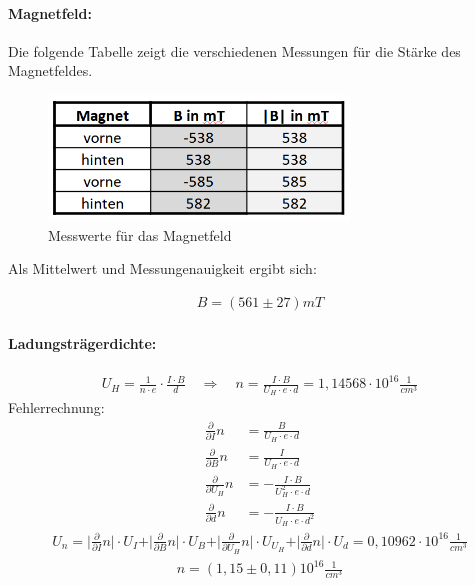 \documentclass[a4paper]{scrartcl}
\numberwithin{equation}{subsection}
\begin{document}
\paragraph{Magnetfeld:\\}
Die folgende Tabelle zeigt die verschiedenen Messungen für die Stärke des Magnetfeldes.

\begin{figure}[H]
\includegraphics[width=8cm]{tabelle_messwerte_megnetfeld}
\centering
\caption{Messwerte für das Magnetfeld}
\centering
\label{fig:tabelle_messwerte_megnetfeld}
\end{figure}

Als Mittelwert und Messungenauigkeit ergibt sich:

\begin{align*}
B = (561\pm27)mT
\end{align*}

\paragraph{Ladungsträgerdichte:\\}
\begin{align}
U_H = \frac{1}{n \cdot e} \cdot \frac{I \cdot B}{d} \quad \Rightarrow \quad n = \frac{I \cdot B}{U_H \cdot e \cdot d} = 1,14568 \cdot 10^{16} \frac{1}{cm^3}
\end{align}
Fehlerrechnung:
\begin{align*}
\frac{\partial}{\partial I} n &= \frac{B}{U_H \cdot e \cdot d} \\
\frac{\partial}{\partial B} n &= \frac{I}{U_H \cdot e \cdot d} \\
\frac{\partial}{\partial U_H} n &= -\frac{I \cdot B}{U_H^2 \cdot e \cdot d} \\
\frac{\partial}{\partial d} n &= -\frac{I \cdot B}{U_H \cdot e \cdot d^2}
\end{align*}
\begin{align*}
U_{n} = \vert \frac{\partial}{\partial I} n \vert \cdot U_{I} + 
		\vert \frac{\partial}{\partial B} n \vert \cdot U_{B} +
		\vert \frac{\partial}{\partial U_H} n \vert \cdot U_{U_H} +
		\vert \frac{\partial}{\partial d} n \vert \cdot U_{d} = 0,10962 \cdot 10^{16} \frac{1}{cm^3}
\end{align*}
\begin{align*}
n = (1,15 \pm 0,11)10^{16} \frac{1}{cm^3}
\end{align*}
\end{document}
